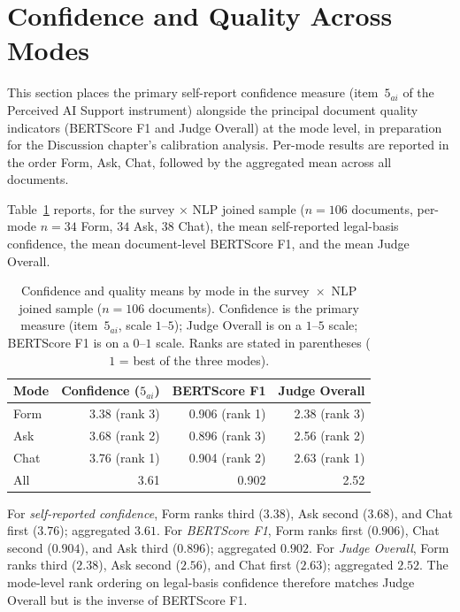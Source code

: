 \section{Confidence and Quality Across Modes}
\label{sec:eval-conf-quality}

This section places the primary self-report confidence measure (item~$5_{ai}$
of the Perceived AI Support instrument) alongside the principal document
quality indicators (BERTScore F1 and Judge Overall) at the mode level, in
preparation for the Discussion chapter's calibration analysis. Per-mode
results are reported in the order Form, Ask, Chat, followed by the aggregated
mean across all documents.

Table~\ref{tab:conf-quality} reports, for the survey × NLP joined sample
($n = 106$ documents, per-mode $n = 34$ Form, $34$ Ask, $38$ Chat), the
mean self-reported legal-basis confidence, the mean document-level BERTScore
F1, and the mean Judge Overall.

\begin{table}[htbp]
\centering
\caption{Confidence and quality means by mode in the survey~$\times$~NLP
joined sample ($n = 106$ documents). Confidence is the primary measure
(item~$5_{ai}$, scale $1$--$5$); Judge Overall is on a $1$--$5$ scale; BERTScore
F1 is on a $0$--$1$ scale. Ranks are stated in parentheses ($1$ = best of the
three modes).}
\label{tab:conf-quality}
\begin{tabular}{@{}l r r r@{}}
\toprule
Mode & Confidence ($5_{ai}$) & BERTScore F1 & Judge Overall \\
\midrule
Form & 3.38 (rank 3) & 0.906 (rank 1) & 2.38 (rank 3) \\
Ask  & 3.68 (rank 2) & 0.896 (rank 3) & 2.56 (rank 2) \\
Chat & 3.76 (rank 1) & 0.904 (rank 2) & 2.63 (rank 1) \\
\midrule
All  & 3.61 & 0.902 & 2.52 \\
\bottomrule
\end{tabular}
\end{table}

For \emph{self-reported confidence}, Form ranks third ($3.38$), Ask second
($3.68$), and Chat first ($3.76$); aggregated $3.61$. For \emph{BERTScore
F1}, Form ranks first ($0.906$), Chat second ($0.904$), and Ask third
($0.896$); aggregated $0.902$. For \emph{Judge Overall}, Form ranks third
($2.38$), Ask second ($2.56$), and Chat first ($2.63$); aggregated $2.52$.
The mode-level rank ordering on legal-basis confidence therefore matches
Judge Overall but is the inverse of BERTScore F1.

